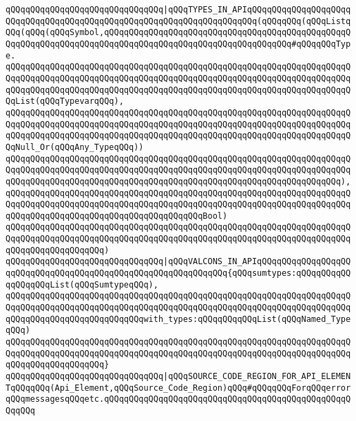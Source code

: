 \newline
\verb|qQQqqQQqqQQqqQQqqQQqqQQqqQQqqQQq|\verb#|qQQqTYPES_IN_APIqQQqqQQqqQQqqQQqqQQqqQQqqQQqqQQqqQQqqQQqqQQqqQQqqQQqqQQqqQQqqQQqqQQqqQQq(qQQqqQQq(qQQqListqQQq(qQQq(qQQqSymbol,qQQqqQQqqQQqqQQqqQQqqQQqqQQqqQQqqQQqqQQqqQQqqQQqqQQqqQQqqQQqqQQqqQQqqQQqqQQqqQQqqQQqqQQqqQQqqQQqqQQqqQQqqQQq#\verb|#qQQqqQQqType.|\newline
\verb|qQQqqQQqqQQqqQQqqQQqqQQqqQQqqQQqqQQqqQQqqQQqqQQqqQQqqQQqqQQqqQQqqQQqqQQqqQQqqQQqqQQqqQQqqQQqqQQqqQQqqQQqqQQqqQQqqQQqqQQqqQQqqQQqqQQqqQQqqQQqqQQqqQQqqQQqqQQqqQQqqQQqqQQqqQQqqQQqqQQqqQQqqQQqqQQqqQQqqQQqqQQqqQQqqQQqList(qQQqTypevarqQQq),|\newline
\verb|qQQqqQQqqQQqqQQqqQQqqQQqqQQqqQQqqQQqqQQqqQQqqQQqqQQqqQQqqQQqqQQqqQQqqQQqqQQqqQQqqQQqqQQqqQQqqQQqqQQqqQQqqQQqqQQqqQQqqQQqqQQqqQQqqQQqqQQqqQQqqQQqqQQqqQQqqQQqqQQqqQQqqQQqqQQqqQQqqQQqqQQqqQQqqQQqqQQqqQQqqQQqqQQqqQQqNull_Or(qQQqAny_TypeqQQq))|\newline
\verb|qQQqqQQqqQQqqQQqqQQqqQQqqQQqqQQqqQQqqQQqqQQqqQQqqQQqqQQqqQQqqQQqqQQqqQQqqQQqqQQqqQQqqQQqqQQqqQQqqQQqqQQqqQQqqQQqqQQqqQQqqQQqqQQqqQQqqQQqqQQqqQQqqQQqqQQqqQQqqQQqqQQqqQQqqQQqqQQqqQQqqQQqqQQqqQQqqQQqqQQqqQQqqQQq),|\newline
\verb|qQQqqQQqqQQqqQQqqQQqqQQqqQQqqQQqqQQqqQQqqQQqqQQqqQQqqQQqqQQqqQQqqQQqqQQqqQQqqQQqqQQqqQQqqQQqqQQqqQQqqQQqqQQqqQQqqQQqqQQqqQQqqQQqqQQqqQQqqQQqqQQqqQQqqQQqqQQqqQQqqQQqqQQqqQQqqQQqqQQqBool)|\newline
\verb|qQQqqQQqqQQqqQQqqQQqqQQqqQQqqQQqqQQqqQQqqQQqqQQqqQQqqQQqqQQqqQQqqQQqqQQqqQQqqQQqqQQqqQQqqQQqqQQqqQQqqQQqqQQqqQQqqQQqqQQqqQQqqQQqqQQqqQQqqQQqqQQqqQQqqQQqqQQqqQQq)|\newline
\newline
\verb|qQQqqQQqqQQqqQQqqQQqqQQqqQQqqQQq|\verb#|qQQqVALCONS_IN_APIqQQqqQQqqQQqqQQqqQQqqQQqqQQqqQQqqQQqqQQqqQQqqQQqqQQqqQQqqQQqqQQq{qQQqsumtypes:qQQqqQQqqQQqqQQqqQQqList(qQQqSumtypeqQQq),#\newline
\verb|qQQqqQQqqQQqqQQqqQQqqQQqqQQqqQQqqQQqqQQqqQQqqQQqqQQqqQQqqQQqqQQqqQQqqQQqqQQqqQQqqQQqqQQqqQQqqQQqqQQqqQQqqQQqqQQqqQQqqQQqqQQqqQQqqQQqqQQqqQQqqQQqqQQqqQQqqQQqqQQqqQQqqQQqwith_types:qQQqqQQqqQQqList(qQQqNamed_TypeqQQq)|\newline
\verb|qQQqqQQqqQQqqQQqqQQqqQQqqQQqqQQqqQQqqQQqqQQqqQQqqQQqqQQqqQQqqQQqqQQqqQQqqQQqqQQqqQQqqQQqqQQqqQQqqQQqqQQqqQQqqQQqqQQqqQQqqQQqqQQqqQQqqQQqqQQqqQQqqQQqqQQqqQQqqQQq}|\newline
\newline
\verb|qQQqqQQqqQQqqQQqqQQqqQQqqQQqqQQq|\verb#|qQQqSOURCE_CODE_REGION_FOR_API_ELEMENTqQQqqQQq(Api_Element,qQQqSource_Code_Region)qQQq#\verb|#qQQqqQQqForqQQqerrorqQQqmessagesqQQqetc.qQQqqQQqqQQqqQQqqQQqqQQqqQQqqQQqqQQqqQQqqQQqqQQqqQQqqQQq|\newline
